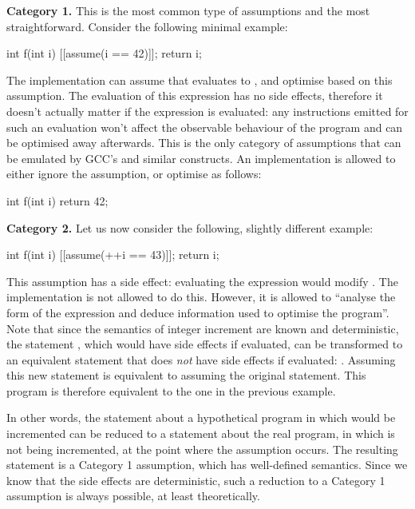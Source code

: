 \textbf{Category 1.} This is the most common type of assumptions and the most straightforward. Consider the following minimal example:

\begin{codeblock}
int f(int i) {
  [[assume(i == 42)]];
  return i;
}
\end{codeblock}

The implementation can assume that  evaluates to , and optimise based on this assumption. The evaluation of this expression has no side effects, therefore it doesn't actually matter if the expression is evaluated: any instructions emitted for such an evaluation won't affect the observable behaviour of the program and can be optimised away afterwards. This is the only category of assumptions that can be emulated by GCC's  and similar constructs. An implementation is allowed to either ignore the assumption, or optimise  as follows:

\begin{codeblock}
int f(int i) {
  return 42;
}
\end{codeblock}

\textbf{Category 2.} Let us now consider the following, slightly different example:

\begin{codeblock}
int f(int i) {
  [[assume(++i == 43)]];
  return i;
}
\end{codeblock}

This assumption has a side effect: evaluating the expression would modify . The implementation is not allowed to do this. However, it is allowed to ``analyse the form of the expression and deduce information used to optimise the program''. Note that since the semantics of integer increment are known and deterministic, the statement , which would have side effects if evaluated, can be transformed to an equivalent statement that does \emph{not} have side effects if evaluated: . Assuming this new statement is equivalent to assuming the original statement. This program is therefore equivalent to the one in the previous example.

In other words, the statement about a hypothetical program in which  would be incremented can be reduced to a statement about the real program, in which  is not being incremented, at the point where the assumption occurs. The resulting statement is a Category 1 assumption, which has well-defined semantics. Since we know that the side effects are deterministic, such a reduction to a Category 1 assumption is always possible, at least theoretically.

